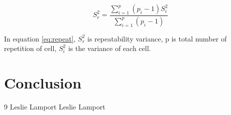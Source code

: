 \documentclass[11pt,a4paper,headinclude,footinclude,chapterprefix=on]{scrreprt}
\begin{document}
\begin{equation}\label{eq:repeat}
{S}_r^2 = \frac{\sum\limits_{i=1}^{p} (p_{i} - 1){S}_i^2}
{\sum\limits_{i=1}^{p}(p_{i} - 1)}
\end{equation}

In equation \ref{eq:repeat},
${S}_r^2$ is repeatability variance, p is total number of repetition of cell, $S_{i}^{2}$ is the variance of each cell.



\chapter{Conclusion}

\pagebreak 

\begin{thebibliography}
	{9}  Leslie Lamport  Leslie Lamport 
\end{thebibliography}
\end{document}
